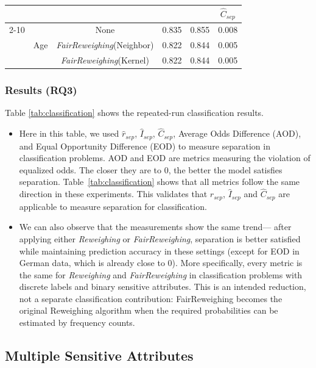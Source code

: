 \begin{table}[ht]
\begin{center}
\begin{tabular}{l|c|c|c|c|c|c|c|c|c}
   &\multicolumn{4}{c|}{}& \multicolumn{5}{c}{$\hat{C}_{sep}$}\\ \cline{2-10}

   & \multirow{4}{*}{Age} & {None} & 0.835 & 0.855 & \multicolumn{5}{c}{0.008} \\ 
  
  
  & & {\emph{FairReweighing}(Neighbor)} & 0.822 & 0.844 & \multicolumn{5}{c}{0.005} \\
  
  & & {\emph{FairReweighing}(Kernel)} & 0.822 & 0.844 & \multicolumn{5}{c}{0.005} \\ \hline
  \end{tabular}
  \end{center}
\end{table}

\subsubsection{Results (\textbf{RQ3})} 
Table \ref{tab:classification} shows the repeated-run classification results. 
\begin{itemize}
\item
Here in this table, we used $\hat{r}_{sep}$, $\hat{I}_{sep}$, $\hat{C}_{sep}$, Average Odds Difference (AOD), and Equal Opportunity Difference (EOD) to measure separation in classification problems. AOD and EOD are metrics measuring the violation of equalized odds. The closer they are to $0$, the better the model satisfies separation. Table~\ref{tab:classification} shows that all metrics follow the same direction in these experiments. This validates that $\hat{r}_{sep}$, $\hat{I}_{sep}$ and $\hat{C}_{sep}$ are applicable to measure separation for classification.
\item
We can also observe that the measurements show the same trend--- after applying either \emph{Reweighing} or \emph{FairReweighing}, separation is better satisfied while maintaining prediction accuracy in these settings (except for EOD in German data, which is already close to 0). More specifically, every metric is the same for \emph{Reweighing} and \emph{FairReweighing} in classification problems with discrete labels and binary sensitive attributes. This is an intended reduction, not a separate classification contribution: FairReweighing becomes the original Reweighing algorithm when the required probabilities can be estimated by frequency counts.
\end{itemize}

\subsection{Multiple Sensitive Attributes}


